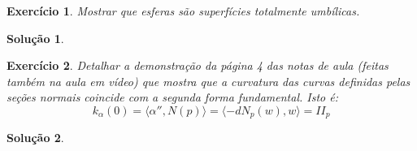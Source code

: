 \documentclass[a4paper,12pt]{article}
\theoremstyle{exer}
\newtheorem{exercise}{Exercício}
\theoremstyle{definition}
\newtheorem{solution}{Solução}
\theoremstyle{plain}
\begin{document}
\begin{exercise}
    Mostrar que esferas são superfícies totalmente umbílicas.
\end{exercise}

\begin{solution}
    
\end{solution}

\begin{exercise}
    Detalhar a demonstração da página 4 das notas de aula (feitas também na
    aula em vídeo) que mostra que a curvatura das curvas definidas pelas
    seções normais coincide com a segunda forma fundamental. Isto é:
    $$
    k_{\alpha}(0) = \langle \alpha'', N(p) \rangle = \langle - dN_p(w), w \rangle = II_p
    $$
\end{exercise}

\begin{solution}
    
\end{solution}


\end{document}
